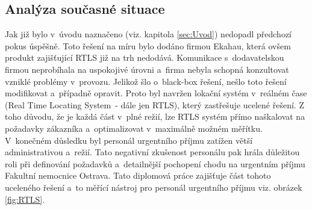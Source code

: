 \subsection{Analýza současné situace}

Jak již bylo v~úvodu naznačeno (viz. kapitola \ref{sec:Uvod}) nedopadl předchozí pokus úspěšně. Toto řešení na míru bylo dodáno firmou Ekahau, která ovšem produkt zajišťující RTLS již na trh nedodává. Komunikace s~dodavatelskou firmou neprobíhala na uspokojivé úrovni a~firma nebyla schopná konzultovat vzniklé problémy v~provozu. Jelikož šlo o~black-box řešení, nešlo toto řešení modifikovat a~případně opravit. Proto byl navržen lokační systém v~reálném čase (Real Time Locating System~- dále jen RTLS), který zastřešuje ucelené řešení. Z toho důvodu, že je každá část v~plné režií, lze RTLS systém přímo naškalovat na požadavky zákazníka a~optimalizovat v~maximálně možném měřítku. V~konečném důsledku byl personál urgentního příjmu zatížen větší administrativou a~režií. Tato negativní zkušenost personálu pak hrála důležitou roli při definování požadavků a~detailnější pochopení chodu na urgentním příjmu Fakultní nemocnice Ostrava. Tato diplomová práce zajišťuje část tohoto uceleného řešení a~to měřící nástroj pro personál urgentního příjmu viz. obrázek \ref{fig:RTLS}.

